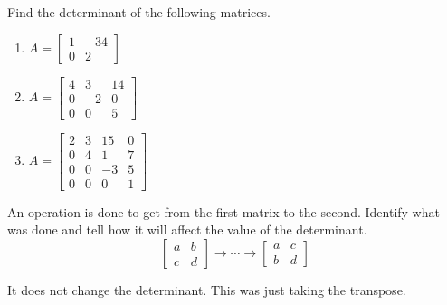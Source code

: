 \documentclass{ximera}
\begin{document}
\begin{problem}\label{prb:7.8} Find the determinant of the following matrices.

\begin{enumerate}
\item
$A = \left[ \begin{array}{rr}
1 & -34 \\
0 & 2
\end{array} \right] $

\item
$A = \left[ \begin{array}{rrr}
4 & 3 & 14 \\
 0 & -2 & 0 \\
0 & 0 & 5
\end{array} \right]$

\item
$A = \left[ \begin{array}{rrrr}
2 & 3 & 15 & 0 \\
0 & 4 & 1 & 7 \\
0 & 0 & -3 & 5 \\
0 & 0 & 0 & 1
\end{array} \right]$
\end{enumerate}


\end{problem}

\begin{problem}\label{prb:7.9} An operation is done to get from the first matrix to the second.
Identify what was done and tell how it will affect the value of the
determinant.
\begin{equation*}
\left[
\begin{array}{cc}
a & b \\
c & d
\end{array}
\right]  \rightarrow \cdots \rightarrow \left[
\begin{array}{cc}
a & c \\
b & d
\end{array}
\right]
\end{equation*}
\begin{hint}
It does not change the determinant. This was just taking the transpose.
\end{hint}
\end{problem}
\end{document}
